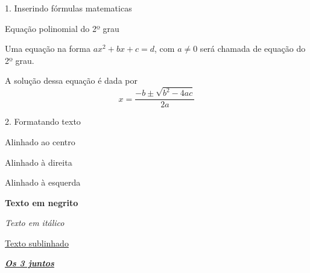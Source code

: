 \documentclass[a4paper, 12pt]{article} %
\begin{document}
1. Inserindo fórmulas matematicas

Equação polinomial do 2º grau

Uma equação na forma $ax^2 + bx + c = d$, com $a \neq 0$ será chamada de equação do 2º grau.

A solução dessa equação é dada por $$x = \frac{-b \pm \sqrt{b^2 - 4ac}}{2a}$$

2. Formatando texto

\begin{center}
Alinhado ao centro
\end{center}

\begin{flushright}
Alinhado à direita
\end{flushright}

\begin{flushleft}
Alinhado à esquerda
\end{flushleft}

\textbf{Texto em negrito}

\textit{Texto em itálico}

\underline{Texto sublinhado}

\textbf{\textit{\underline{Os 3 juntos}}}
\end{document}
